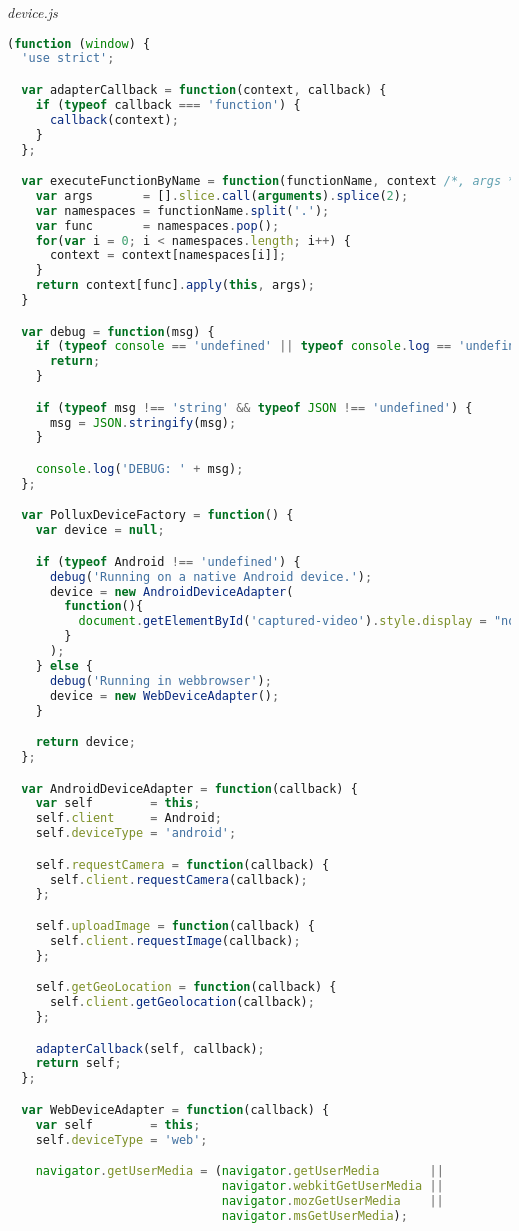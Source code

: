 \emph{device.js}
\begin{lstlisting}[language=JavaScript]
(function (window) {
  'use strict';

  var adapterCallback = function(context, callback) {
    if (typeof callback === 'function') {
      callback(context);
    }
  };

  var executeFunctionByName = function(functionName, context /*, args */) {
    var args       = [].slice.call(arguments).splice(2);
    var namespaces = functionName.split('.');
    var func       = namespaces.pop();
    for(var i = 0; i < namespaces.length; i++) {
      context = context[namespaces[i]];
    }
    return context[func].apply(this, args);
  }

  var debug = function(msg) {
    if (typeof console == 'undefined' || typeof console.log == 'undefined') {
      return;
    }

    if (typeof msg !== 'string' && typeof JSON !== 'undefined') {
      msg = JSON.stringify(msg);
    }

    console.log('DEBUG: ' + msg);
  };

  var PolluxDeviceFactory = function() {
    var device = null;

    if (typeof Android !== 'undefined') {
      debug('Running on a native Android device.');
      device = new AndroidDeviceAdapter(
        function(){
          document.getElementById('captured-video').style.display = "none";
        }
      );
    } else {
      debug('Running in webbrowser');
      device = new WebDeviceAdapter();
    }

    return device;
  };

  var AndroidDeviceAdapter = function(callback) {
    var self        = this;
    self.client     = Android;
    self.deviceType = 'android';

    self.requestCamera = function(callback) {
      self.client.requestCamera(callback);
    };

    self.uploadImage = function(callback) {
      self.client.requestImage(callback);
    };

    self.getGeoLocation = function(callback) {
      self.client.getGeolocation(callback);
    };

    adapterCallback(self, callback);
    return self;
  };

  var WebDeviceAdapter = function(callback) {
    var self        = this;
    self.deviceType = 'web';

    navigator.getUserMedia = (navigator.getUserMedia       ||
                              navigator.webkitGetUserMedia ||
                              navigator.mozGetUserMedia    ||
                              navigator.msGetUserMedia);


\end{lstlisting}
